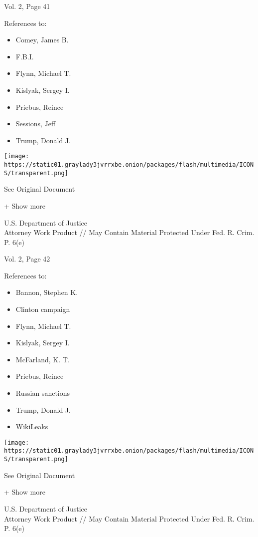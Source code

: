Vol. 2, Page 41

References to:

\begin{itemize}
\tightlist
\item
  Comey, James B.
\item
  F.B.I.
\item
  Flynn, Michael T.
\item
  Kislyak, Sergey I.
\item
  Priebus, Reince
\item
  Sessions, Jeff
\item
  Trump, Donald J.
\end{itemize}

\protect\hyperlink{}{}

\texttt{[image: https://static01.graylady3jvrrxbe.onion/packages/flash/multimedia/ICONS/transparent.png]}

See Original Document

+ Show more

U.S. Department of Justice\\
Attorney Work Product // May Contain Material Protected Under Fed. R.
Crim. P. 6(e)

Vol. 2, Page 42

References to:

\begin{itemize}
\tightlist
\item
  Bannon, Stephen K.
\item
  Clinton campaign
\item
  Flynn, Michael T.
\item
  Kislyak, Sergey I.
\item
  McFarland, K. T.
\item
  Priebus, Reince
\item
  Russian sanctions
\item
  Trump, Donald J.
\item
  WikiLeaks
\end{itemize}

\protect\hyperlink{}{}

\texttt{[image: https://static01.graylady3jvrrxbe.onion/packages/flash/multimedia/ICONS/transparent.png]}

See Original Document

+ Show more

U.S. Department of Justice\\
Attorney Work Product // May Contain Material Protected Under Fed. R.
Crim. P. 6(e)

